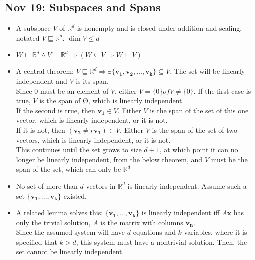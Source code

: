 \documentclass[10pt, oneside]{article}
\let\subspeq\sqsubseteq
\let\leq\leqslant
\newcommand{\R}{\mathbb{R}}
\let \foo \O
\renewcommand{\O}{\text{\foo}}
\renewcommand{\vec}[1]{\mathbf{#1}}
\begin{document}
\subsection{Nov 19: Subspaces and Spans}
\begin{itemize}
    \item A subspace $V$ of $\R^d$ is nonempty and is closed under addition and scaling, notated $V \subspeq \R^d$. $\dim V \leq d$
    \item $W \subspeq \R^d \land V \subspeq \R^d \Rightarrow (W \subseteq V \Rightarrow W \subspeq V)$
    \item A central theorem: $V \subspeq \R^d \Rightarrow \exists \{\vec{v_1}, \vec{v_2}, \hdots , \vec{v_k}\}  \subseteq V$. The set will be linearly independent and $V$ is its span.\\
        Since $0$ must be an element of $V$, either $V = \{0\} of V \neq \{0\}$. If the first case is true, $V$ is the span of $\O$, which is linearly independent.\\
        If the second is true, then $\vec{v_1} \in V$. Either $V$ is the span of the set of this one vector, which is linearly independent, or it is not.\\
        If it is not, then $(\vec{v_2} \neq r \vec{v_1}) \in V$. Either $V$ is the span of the set of two vectors, which is linearly independent, or it is not.\\
        This continues until the set grows to size $d+1$, at which point it can no longer be linearly independent, from the below theorem, and $V$ must be the span of the set, which can only be $\R^d$
    \item No set of more than $d$ vectors in $\R^d$ is linearly independent. Assume such a set $\{\vec{v_1}, \hdots , \vec{v_k}\}$ existed.
    \item A related lemma solves this: $\{\vec{v_1}, \hdots , \vec{v_k}\}$ is linearly independent iff $A\vec{x}$ has only the trivial solution, $A$ is the matrix with columns $\vec{v_n}$.\\
        Since the assumed system will have $d$ equations and $k$ variables, where it is specified that $k > d$, this system must have a nontrivial solution. Then, the set cannot be linearly independent.
\end{itemize}
\end{document}
